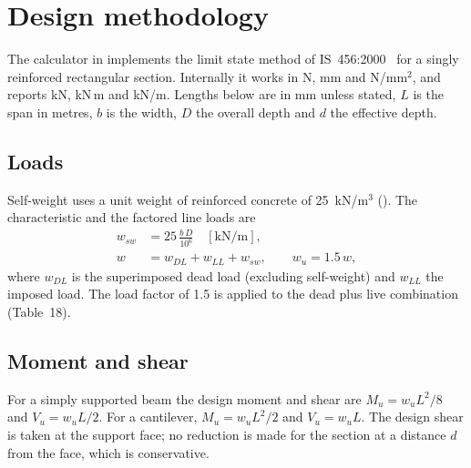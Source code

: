 \chapter{Design methodology}\label{ch:method}

The calculator  in  implements the limit state method of IS~456:2000~\cite{is456} for a singly reinforced rectangular section. Internally it works in N, mm and N/mm$^2$, and reports kN, kN\,m and kN/m. Lengths below are in mm unless stated, $L$ is the span in metres, $b$ is the width, $D$ the overall depth and $d$ the effective depth.

\section{Loads}
Self-weight uses a unit weight of reinforced concrete of 25~kN/m$^3$ (). The characteristic and the factored line loads are
\begin{align}
  w_{sw} &= 25\,\frac{b\,D}{10^{6}} \quad [\text{kN/m}],\\
  w      &= w_{DL} + w_{LL} + w_{sw}, \qquad w_u = 1.5\,w,
\end{align}
where $w_{DL}$ is the superimposed dead load (excluding self-weight) and $w_{LL}$ the imposed load. The load factor of 1.5 is applied to the dead plus live combination (Table~18).

\section{Moment and shear}
For a simply supported beam the design moment and shear are $M_u = w_u L^2/8$ and $V_u = w_u L/2$. For a cantilever, $M_u = w_u L^2/2$ and $V_u = w_u L$. The design shear is taken at the support face; no reduction is made for the section at a distance $d$ from the face, which is conservative.

